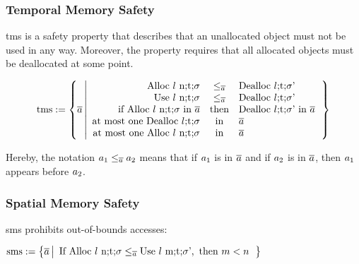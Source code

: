 \documentclass[utf8,acmsmall,review,screen,dvipsnames,anonymous]{acmart}
\begin{document}
\subsubsection{Temporal Memory Safety}

\gls{tms} is a safety property that describes that an unallocated object must not be used in any way.
Moreover, the property requires that all allocated objects must be deallocated at some point.

\begin{definition}\label{def:trace:tmsdef}
  $$
  \tmssafe:=\left\{\trace \left| \begin{array}{rcl}
                              \ev{Alloc\ \loc\ n;\sandboxtag;\securitytag}&\le_{\trace}&\ev{Dealloc\ \loc;\sandboxtag;\securitytag'} \\
                              \ev{Use\ \loc\ n;\sandboxtag;\securitytag}&\le_{\trace}&\ev{Dealloc\ \loc;\sandboxtag;\securitytag'} \\
                              \text{if }\ev{Alloc\ \loc\ n;\sandboxtag;\securitytag}\text{ in }\trace&\text{then}&\ev{Dealloc\ \loc;\sandboxtag;\securitytag'}\text{ in }\trace \\
                              \text{at most one }\ev{Dealloc\ \loc;\sandboxtag;\securitytag}&\text{in}&\trace \\
                              \text{at most one }\ev{Alloc\ \loc\ n;\sandboxtag;\securitytag}&\text{in}&\trace \\
                            \end{array}\right.\right\}
  $$
\end{definition}
Hereby, the notation $\event[_{1}]\le_{\trace}\event[_{2}]$ means that if $\event[_{1}]$ is in $\trace$ and if $\event[_{2}]$ is in $\trace$, then $\event[_{1}]$ appears before $\event[_{2}]$.

\subsubsection{Spatial Memory Safety}

\gls{sms} prohibits out-of-bounds accesses:

\begin{definition}\label{def:trace:smsdef}
  $
  \smssafe:=\left\{\trace \left|\begin{array}{rcl}
                                  \text{If }\ev{Alloc\ \loc\ n;\sandboxtag;\securitytag}\le_{\trace}\ev{Use\ \loc\ m;\sandboxtag;\securitytag'}, \text{ then }m<n
                                \end{array}\right.\right\}
  $
\end{definition}
\end{document}
